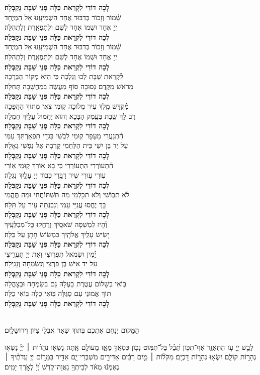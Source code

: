 \documentclass[twoside, openany, parskip=half, 11pt]{book}
\begin{document}
\newcommand{\lechadodi}{\textbf{לְכָה דוֹדִי לִקְרַאת כַּלָּה פְּנֵי שַׁבָּת נְקַבְּלָה׃}\\}

\newcommand{\lechadodiverse}[4]{
#1 \hfill #2\\
#3 \hfill #4\\
}

\lechadodi
\lechadodiverse{שָׁ֗מוֹר וְזָכוֹר בְּדִבּוּר אֶחָד}{הִשְׁמִיעָֽנוּ אֵל הַמְיֻחָד}{יְיָ אֶחָד וּשְׁמוֹ אֶחָד}{לְשֵׁם וּלְתִפְאֶֽרֶת וְלִתְהִלָּה׃}
\lechadodi
\lechadodiverse{ שָׁ֗מוֹר וְזָכוֹר בְּדִבּוּר אֶחָד}{הִשְׁמִיעָֽנוּ אֵל הַמְיֻחָד}{יְיָ אֶחָד וּשְׁמוֹ אֶחָד}{לְשֵׁם וּלְתִפְאֶֽרֶת וְלִתְהִלָּה׃}
\lechadodi
\lechadodiverse{לִ֗קְרַאת שַׁבָּת לְכוּ וְנֵלְכָה}{כִּי הִיא מְקוֹר הַבְּרָכָה}{מֵרֹאשׁ מִקֶּֽדֶם נְסוּכָה}{סוֹף מַעֲשֶׂה בְּמַחֲשָׁבָה תְּחִלָּה׃}
\lechadodi
\lechadodiverse{מִ֗קְדַּשׁ מֶֽלֶךְ עִיר מְלוּכָה}{קֽוּמִי צְאִי מִתּוֹךְ הַהֲפֵכָה}{רַב לָךְ שֶֽׁבֶת בְּעֵֽמֶק הַבָּכָא}{וְהוּא יַחֲמוֹל עָלַֽיִךְ חֶמְלָה׃}
\lechadodi
\lechadodiverse{הִ֗תְנַעֲרִי מֵעָפָר קֽוּמִי}{לִבְשִׁי בִּגְדֵי תִפְאַרְתֵּךְ עַמִּי}{עַל יַד בֶּן יִשַׁי בֵּית הַלַּחְמִי}{קׇרְבָה אֶל נַפְשִׁי גְאָלָהּ׃}
\lechadodi
\lechadodiverse{הִ֗תְעוֹרְרִי הִתְעוֹרְרִי}{כִּי בָא אוֹרֵךְ קֽוּמִי אֽוֹרִי}{עֽוּרִי עֽוּרִי שִׁיר דַבֵּֽרִי}{כְּבוֹד יְיָ עָלַֽיִךְ נִגְלָה׃}
\lechadodi
\lechadodiverse{לֹ֗א תֵבֽוֹשִׁי וְלֹא תִכָּלְמִי}{מַה תִּשְׁתּוֹחֲחִי וּמַה תֶּהֱמִי}{בָּךְ יֶחֱסוּ עֲנִיֵּי עַמִּי}{וְנִבְנְתָה עִיר עַל תִּלָּהּ׃}
\lechadodi
\lechadodiverse{וְ֗הָיוּ לִמְשִׁסָּה שֹׁאסָֽיִךְ}{וְרָחֲקוּ כׇּל־מְבַלְּעָֽיִךְ}{יָשִׂישׂ עָלַֽיִךְ אֱלֹהָֽיִךְ}{כִּמְשׂוֹשׂ חָתָן עַל כַּלָּה׃}
\lechadodi
\lechadodiverse{יָ֗מִין וּשְׂמֹאל תִּפְרֽוֹצִי}{וְאֶת יְיָ תַּעֲרִֽיצִי}{עַל יַד אִישׁ בֶּן פַּרְצִי}{וְנִשְׂמְחָה וְנָגִֽילָה׃}
\lechadodi
\lechadodiverse{בּֽוֹאִי בְשָׁלוֹם עֲטֶרֶת בַּעְלָהּ}{גַּם בְּשִׂמְחָה וּבְצׇהֳלָה}{תּוֹךְ אֱמוּנֵי עַם סְגֻּלָּה}{בּֽוֹאִי כַלָּה בּֽוֹאִי כַלָּה׃}
\lechadodi \vspace{-0.5\baselineskip}

\begin{sometimes}

\\
הַמָּקוֹם יְנַחֵם אֶתְכֶם בְּתוֹךְ שְׁאָר אֲבֵלֵי צִיּוֹן וִירוּשָׁלָֽיִם׃

\end{sometimes}


\mizmorshabbat

לָבֵ֣שׁ יְיָ֭ עֹ֣ז הִתְאַזָּ֑ר אַף־תִּכּ֥וֹן תֵּ֝בֵ֗ל בַּל־תִּמּֽוֹט׃
נָכ֣וֹן כִּסְאֲךָ֣ מֵאָ֑ז מֵעוֹלָ֣ם אָֽתָּה׃
נָשְׂא֤וּ נְהָר֨וֹת ׀ יְיָ֗ נָשְׂא֣וּ נְהָר֣וֹת קוֹלָ֑ם יִשְׂא֖וּ נְהָר֣וֹת דׇּכְיָֽם׃
מִקֹּל֨וֹת ׀ מַ֤יִם רַבִּ֗ים אַדִּירִ֣ים מִשְׁבְּרֵי־יָ֑ם אַדִּ֖יר בַּמָּר֣וֹם יְיָ׃
עֵֽדֹתֶ֨יךָ ׀ נֶאֶמְנ֬וּ מְאֹ֗ד לְבֵיתְךָ֥ נַאֲוָה־קֹ֑דֶשׁ יְ֝יָ֗ לְאֹ֣רֶךְ יָמִֽים׃
\end{document}
